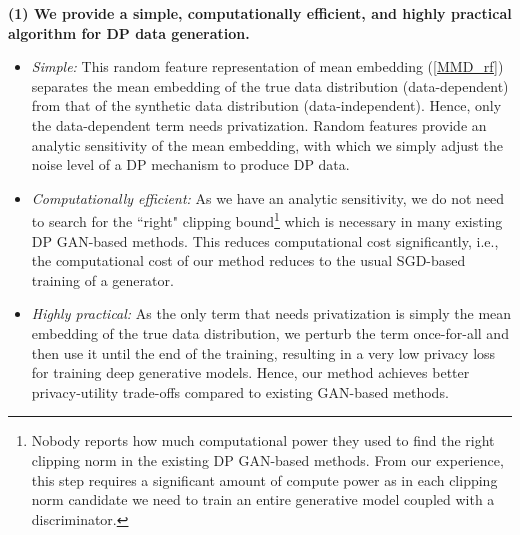 \documentclass{article}
\begin{document}
\textbf{(1) We provide a simple, computationally efficient, and highly practical algorithm for DP data generation.}
    \begin{itemize}
    \item \textit{Simple:} This random feature representation of mean embedding (\eqref{MMD_rf}) separates the mean embedding of the true data distribution (data-dependent) from that of the synthetic data distribution (data-independent). Hence, only the data-dependent term needs privatization. Random features provide an analytic sensitivity of the mean embedding, with which we simply adjust the noise level of a DP mechanism to produce DP data.  
    \item \textit{Computationally efficient:} As we have an analytic sensitivity, we do not need to search for the ``right" clipping bound\footnote{Nobody reports how much computational power they used to find the right clipping norm in the existing DP GAN-based methods. From our experience, this step requires a significant amount of compute power as in each clipping norm candidate we need to train an entire generative model coupled with a discriminator.} which is necessary in many existing DP GAN-based methods. This reduces computational cost significantly, i.e., the computational cost of our method reduces to the usual SGD-based training of a generator.
    \item \textit{Highly practical:}  As the only term that needs privatization is simply the  mean embedding of the true data distribution, we  perturb the term once-for-all and then use it until the end of the training, resulting in a very low privacy loss for training deep generative models. Hence, our method achieves better privacy-utility trade-offs compared to existing GAN-based methods.  
    \end{itemize}
    
\end{document}
